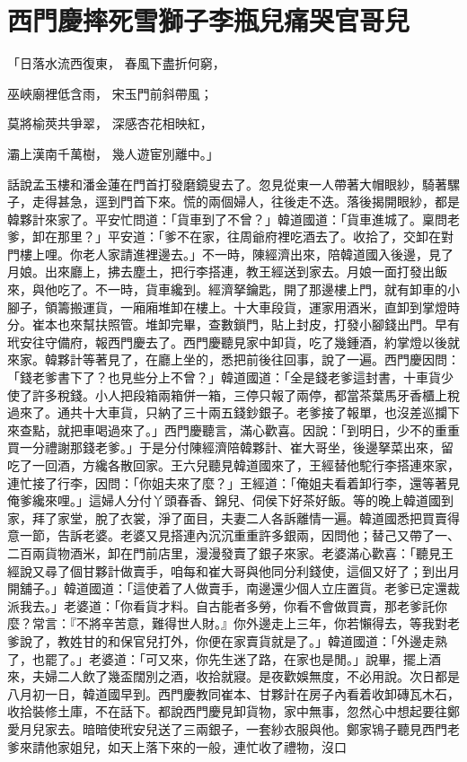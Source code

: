 %

\chapter{西門慶摔死雪獅子\KG 李瓶兒痛哭官哥兒}


「日落水流西復東，  春風下盡折何窮，

巫峽廟裡低含雨，  宋玉門前斜帶風；

莫將榆莢共爭翠，  深感杏花相映紅，

灞上漢南千萬樹，  幾人遊宦別離中。」

話說孟玉樓和潘金蓮在門首打發磨鏡叟去了。忽見從東一人帶著大帽眼紗，騎著騾子，走得甚急，逕到門首下來。慌的兩個婦人，往後走不迭。落後揭開眼紗，都是韓夥計來家了。平安忙問道：「貨車到了不曾？」韓道國道：「貨車進城了。稟問老爹，卸在那里？」平安道：「爹不在家，往周爺府裡吃酒去了。收拾了，交卸在對門樓上哩。你老人家請進裡邊去。」不一時，陳經濟出來，陪韓道國入後邊，見了月娘。出來廳上，拂去塵土，把行李搭連，教王經送到家去。月娘一面打發出飯來，與他吃了。不一時，貨車纔到。經濟拏鑰匙，開了那邊樓上門，就有卸車的小腳子，領籌搬運貨，一廂廂堆卸在樓上。十大車段貨，運家用酒米，直卸到掌燈時分。崔本也來幫扶照管。堆卸完畢，查數鎖門，貼上封皮，打發小腳錢出門。早有玳安往守備府，報西門慶去了。西門慶聽見家中卸貨，吃了幾鍾酒，約掌燈以後就來家。韓夥計等著見了，在廳上坐的，悉把前後往回事，說了一遍。西門慶因問：「錢老爹書下了？也見些分上不曾？」韓道國道：「全是錢老爹這封書，十車貨少使了許多稅錢。小人把段箱兩箱併一箱，三停只報了兩停，都當茶葉馬牙香櫃上稅過來了。通共十大車貨，只納了三十兩五錢鈔銀子。老爹接了報單，也沒差巡攔下來查點，就把車喝過來了。」西門慶聽言，滿心歡喜。因說：「到明日，少不的重重買一分禮謝那錢老爹。」于是分付陳經濟陪韓夥計、崔大哥坐，後邊拏菜出來，留吃了一回酒，方纔各散回家。王六兒聽見韓道國來了，王經替他駝行李搭連來家，連忙接了行李，因問：「你姐夫來了麼？」王經道：「俺姐夫看着卸行李，還等著見俺爹纔來哩。」這婦人分付丫頭春香、錦兒、伺侯下好茶好飯。等的晚上韓道國到家，拜了家堂，脫了衣裳，淨了面目，夫妻二人各訴離情一遍。韓道國悉把買賣得意一節，告訴老婆。老婆又見搭連內沉沉重重許多銀兩，因問他；替己又帶了一、二百兩貨物酒米，卸在門前店里，漫漫發賣了銀子來家。老婆滿心歡喜：「聽見王經說又尋了個甘夥計做賣手，咱每和崔大哥與他同分利錢使，這個又好了；到出月開舖子。」韓道國道：「這使着了人做賣手，南邊還少個人立庄置貨。老爹已定還裁派我去。」老婆道：「你看貨才料。自古能者多勞，你看不會做買賣，那老爹託你麼？常言：『不將辛苦意，難得世人財。』你外邊走上三年，你若懶得去，等我對老爹說了，教姓甘的和保官兒打外，你便在家賣貨就是了。」韓道國道：「外邊走熟了，也罷了。」老婆道：「可又來，你先生迷了路，在家也是閒。」說畢，擺上酒來，夫婦二人飲了幾盃闊別之酒，收拾就寢。是夜歡娛無度，不必用說。次日都是八月初一日，韓道國早到。西門慶教同崔本、甘夥計在房子內看着收卸磚瓦木石，收拾裝修土庫，不在話下。都說西門慶見卸貨物，家中無事，忽然心中想起要往鄭愛月兒家去。暗暗使玳安兒送了三兩銀子，一套紗衣服與他。鄭家鴇子聽見西門老爹來請他家姐兒，如天上落下來的一般，連忙收了禮物，沒口